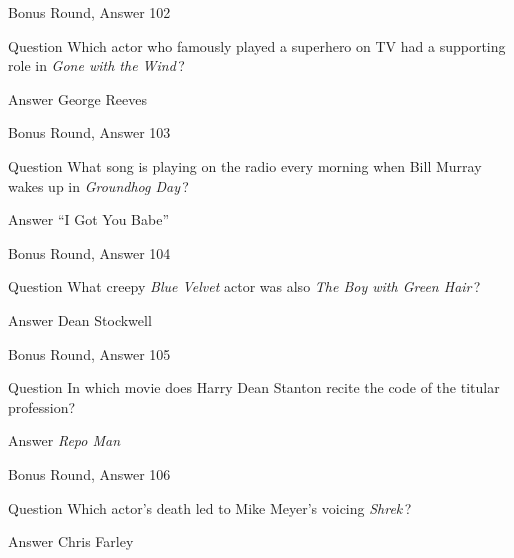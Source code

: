 \documentclass[11pt]{beamer}
\begin{document}
\begin{frame}[t]{Bonus Round, Answer 102}
\vspace{2em}
\begin{block}{Question}
Which actor who famously played a superhero on TV had a supporting role in \emph{Gone with the Wind}\,?
\end{block}
\pause{}
\begin{block}{Answer}
George Reeves
\end{block}
\end{frame}
    

\begin{frame}[t]{Bonus Round, Answer 103}
\vspace{2em}
\begin{block}{Question}
What song is playing on the radio every morning when Bill Murray wakes up in \emph{Groundhog Day}\,?
\end{block}
\pause{}
\begin{block}{Answer}
``I Got You Babe''
\end{block}
\end{frame}
    

\begin{frame}[t]{Bonus Round, Answer 104}
\vspace{2em}
\begin{block}{Question}
What creepy \emph{Blue Velvet} actor was also \emph{The Boy with Green Hair}\,?
\end{block}
\pause{}
\begin{block}{Answer}
Dean Stockwell
\end{block}
\end{frame}
    

\begin{frame}[t]{Bonus Round, Answer 105}
\vspace{2em}
\begin{block}{Question}
In which movie does Harry Dean Stanton recite the code of the titular profession?
\end{block}
\pause{}
\begin{block}{Answer}
\emph{Repo Man}
\end{block}
\end{frame}
    

\begin{frame}[t]{Bonus Round, Answer 106}
\vspace{2em}
\begin{block}{Question}
Which actor's death led to Mike Meyer's voicing \emph{Shrek}\,?
\end{block}
\pause{}
\begin{block}{Answer}
Chris Farley
\end{block}
\end{frame}
    
\end{document}
